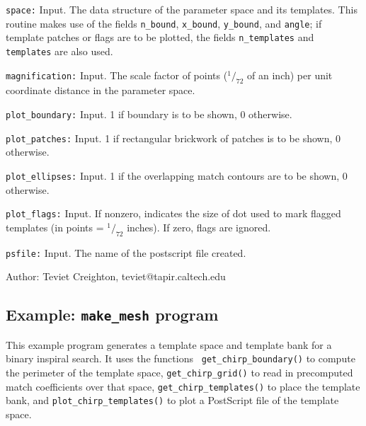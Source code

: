\begin{description}
\item{\tt space:}
  Input.  The data structure of the parameter space and its templates.
  This routine makes use of the fields {\tt n\_bound}, {\tt x\_bound},
  {\tt y\_bound}, and {\tt angle}; if template patches or flags are to
  be plotted, the fields {\tt n\_templates} and {\tt templates} are
  also used.

\item{\tt magnification:}
  Input.  The scale factor of points (${}^1\!/_{72}$ of an inch) per
  unit coordinate distance in the parameter space.

\item{\tt plot\_boundary:}
  Input.  1 if boundary is to be shown, 0 otherwise.

\item{\tt plot\_patches:}
  Input.  1 if rectangular brickwork of patches is to be shown, 0
  otherwise.

\item{\tt plot\_ellipses:}
  Input.  1 if the overlapping match contours are to be shown, 0
  otherwise.

\item{\tt plot\_flags:}
  Input.  If nonzero, indicates the size of dot used to mark flagged
  templates (in points = ${}^1\!/_{72}$ inches).  If zero, flags are
  ignored.

\item{\tt psfile:}
  Input.  The name of the postscript file created.

\end{description}

\begin{description}
\item{Author:}
  Teviet Creighton, teviet@tapir.caltech.edu
\end{description}


\clearpage
\subsection{Example: {\tt make\_mesh} program}
\label{ss:make_mesh}

This example program generates a template space and template bank for
a binary inspiral search.  It uses the functions {\tt
get\_chirp\_boundary()} to compute the perimeter of the template
space, {\tt get\_chirp\_grid()} to read in precomputed match
coefficients over that space, {\tt get\_chirp\_templates()} to place
the template bank, and {\tt plot\_chirp\_templates()} to plot a
PostScript file of the template space.

